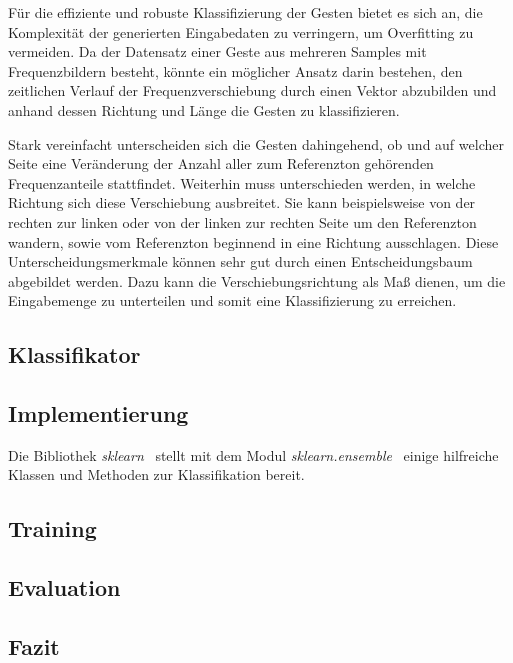 Für die effiziente und robuste Klassifizierung der Gesten bietet es sich an, die Komplexität der generierten Eingabedaten zu verringern, um Overfitting zu vermeiden. Da der Datensatz einer Geste aus mehreren Samples mit Frequenzbildern besteht, könnte ein möglicher Ansatz darin bestehen, den zeitlichen Verlauf der Frequenzverschiebung durch einen Vektor abzubilden und anhand dessen Richtung und Länge die Gesten zu klassifizieren.

Stark vereinfacht unterscheiden sich die Gesten dahingehend, ob und auf welcher Seite eine Veränderung der Anzahl aller zum Referenzton gehörenden Frequenzanteile stattfindet. Weiterhin muss unterschieden werden, in welche Richtung sich diese Verschiebung ausbreitet. Sie kann beispielsweise von der rechten zur linken oder von der linken zur rechten Seite um den Referenzton wandern, sowie vom Referenzton beginnend in eine Richtung ausschlagen. Diese Unterscheidungsmerkmale können sehr gut durch einen Entscheidungsbaum abgebildet werden. Dazu kann die Verschiebungsrichtung als Maß dienen, um die Eingabemenge zu unterteilen und somit eine Klassifizierung zu erreichen.


\subsection{Klassifikator}

\subsection{Implementierung}
Die Bibliothek \textit{sklearn}~\cite{sklearn} stellt mit dem Modul \textit{sklearn.ensemble}~\cite{sklearn.ensemble} einige hilfreiche Klassen und Methoden zur Klassifikation bereit.

\subsection{Training}

\subsection{Evaluation}

\subsection{Fazit}


